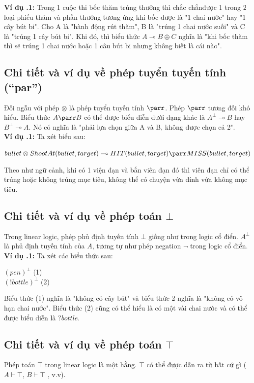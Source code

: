 \documentclass[a4paper]{article}
\begin{document}
\textbf{Ví dụ \thesubsection.1:} Trong 1 cuộc thi bốc thăm trúng thưởng thì chắc chắnđược 1 trong 2 loại phiếu thăm và phần thưởng tương ứng khi bốc được là "1 chai nước" hay "1 cây bút bi". Cho A là "hành động rút thăm", B là "trúng 1 chai nước suối" và C là "trúng 1 cây bút bi". Khi đó, thì biểu thức $A \multimap B \oplus C$ nghĩa là "khi bốc thăm thì sẽ trúng 1 chai nước hoặc 1 câu bút bi nhưng không biết là cái nào".

\subsection{Chi tiết và ví dụ về phép tuyển tuyến tính (“par”)}
Đối ngẫu với phép $\otimes$ là phép tuyển tuyến tính $\parr$. Phép $\parr$ tương đối khó hiểu. Biểu thức $A \parr B$ có thể được biểu diễn dưới dạng khác là $A^{\bot} \multimap B$ hay $B^{\bot} \multimap A$. Nó có nghĩa là "phải lựa chọn giữa A và B, không được chọn cả 2".\\

\textbf{Ví dụ \thesubsection.1:} Ta xét biểu sau:
\begin{center}
$bullet \otimes ShootAt(bullet, target) \multimap HIT(bullet, target) \parr MISS(bullet, target)$
\end{center}
Theo như ngữ cảnh, khi có 1 viện đạn và bắn viên đạn đó thì viên đạn chỉ có thể trúng hoặc không trúng mục tiêu, không thể có chuyện vừa dính vừa không mục tiêu.

\subsection{Chi tiết và ví dụ về phép toán $\bot$}
Trong linear logic, phép phủ định tuyến tính $\bot$ giống như trong logic cổ điển. $A^{\bot}$ là phủ định tuyến tính của $A$, tương tự như phép negation $\lnot$ trong logic cổ điển. \\

\textbf{Ví dụ \thesubsection.1:} Ta xét các biểu thức sau:\\
\begin{center}
    $(pen)^{\bot}$ (1)\\
    $(!bottle)^{\bot}$ (2)
\end{center}
Biểu thức (1) nghĩa là "không có cây bút" và biểu thức 2 nghĩa là "không có vô hạn chai nước". Biểu thức (2) cũng có thể hiểu là có một vài chai nước và có thể được biểu diễn là $?bottle$.

\subsection{Chi tiết và ví dụ về phép toán $\top$}
Phép toán $\top$ trong linear logic là một hằng. $\top$ có thể được dẫn ra từ bất cứ gì ($A \vdash \top$, $B \vdash \top$ , v.v).\\
\end{document}
